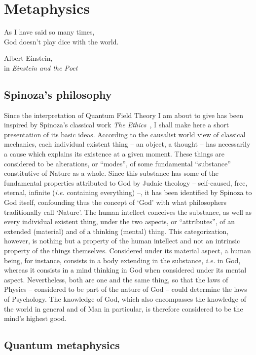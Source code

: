 \chapter{Metaphysics}
\label{Metaphysics}

\renewcommand{\epigraphwidth}{6cm}
\epigraph{As I have said so many times,\\God doesn't play dice with the world.}{Albert Einstein, \\ in \textit{Einstein and the Poet}~\cite{Hermanns1983}}

\section{Spinoza's philosophy}

Since the interpretation of Quantum Field Theory I am about to give has been inspired by Spinoza's classical work \textit{The Ethics}~\cite{Spinoza1677}, I shall make here a short presentation of its basic ideas.
According to the causalist world view of classical mechanics, each individual existent thing -- an object, a thought -- has necessarily a cause which explains its existence at a given moment.
These things are considered to be alterations, or ``modes'', of some fundamental ``substance'' constitutive of Nature as a whole.
Since this substance has some of the fundamental properties attributed to God by Judaic theology -- self-caused, free, eternal, infinite (\textit{i.e.} containing everything) --, it has been identified by Spinoza to God itself, confounding thus the concept of `God' with what philosophers traditionally call `Nature'.
The human intellect conceives the substance, as well as every individual existent thing, under the two aspects, or ``attributes'', of an extended (material) and of a thinking (mental) thing.
This categorization, however, is nothing but a property of the human intellect and not an intrinsic property of the things themselves.
Considered under its material aspect, a human being, for instance, consists in a body extending in the substance, \textit{i.e.} in God, whereas it consists in a mind thinking in God when considered under its mental aspect.
Nevertheless, both are one and the same thing, so that the laws of Physics -- considered to be part of the nature of God -- could determine the laws of Psychology.
The knowledge of God, which also encompasses the knowledge of the world in general and of Man in particular, is therefore considered to be the mind's highest good.

\section{Quantum metaphysics}

